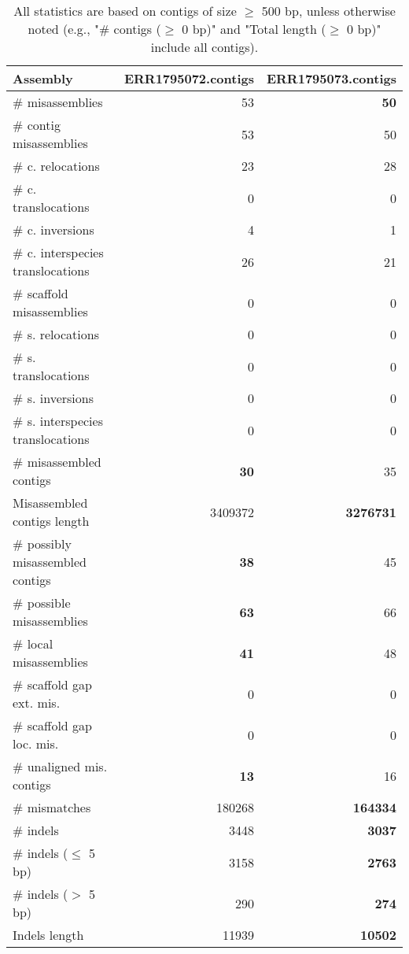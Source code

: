 \documentclass[12pt,a4paper]{article}
\begin{document}
\begin{table}[ht]
\begin{center}
\caption{All statistics are based on contigs of size $\geq$ 500 bp, unless otherwise noted (e.g., "\# contigs ($\geq$ 0 bp)" and "Total length ($\geq$ 0 bp)" include all contigs).}
\begin{tabular}{|l*{2}{|r}|}
\hline
Assembly & ERR1795072.contigs & ERR1795073.contigs \\ \hline
\# misassemblies & 53 & {\bf 50} \\ \hline
\hspace{2mm}\# contig misassemblies & 53 & 50 \\ \hline
\hspace{5mm}\# c. relocations & 23 & 28 \\ \hline
\hspace{5mm}\# c. translocations & 0 & 0 \\ \hline
\hspace{5mm}\# c. inversions & 4 & 1 \\ \hline
\hspace{5mm}\# c. interspecies translocations & 26 & 21 \\ \hline
\hspace{2mm}\# scaffold misassemblies & 0 & 0 \\ \hline
\hspace{5mm}\# s. relocations & 0 & 0 \\ \hline
\hspace{5mm}\# s. translocations & 0 & 0 \\ \hline
\hspace{5mm}\# s. inversions & 0 & 0 \\ \hline
\hspace{5mm}\# s. interspecies translocations & 0 & 0 \\ \hline
\# misassembled contigs & {\bf 30} & 35 \\ \hline
Misassembled contigs length & 3409372 & {\bf 3276731} \\ \hline
\# possibly misassembled contigs & {\bf 38} & 45 \\ \hline
\hspace{5mm}\# possible misassemblies & {\bf 63} & 66 \\ \hline
\# local misassemblies & {\bf 41} & 48 \\ \hline
\# scaffold gap ext. mis. & 0 & 0 \\ \hline
\# scaffold gap loc. mis. & 0 & 0 \\ \hline
\# unaligned mis. contigs & {\bf 13} & 16 \\ \hline
\# mismatches & 180268 & {\bf 164334} \\ \hline
\# indels & 3448 & {\bf 3037} \\ \hline
\hspace{5mm}\# indels ($\leq$ 5 bp) & 3158 & {\bf 2763} \\ \hline
\hspace{5mm}\# indels ($>$ 5 bp) & 290 & {\bf 274} \\ \hline
Indels length & 11939 & {\bf 10502} \\ \hline
\end{tabular}
\end{center}
\end{table}
\end{document}
